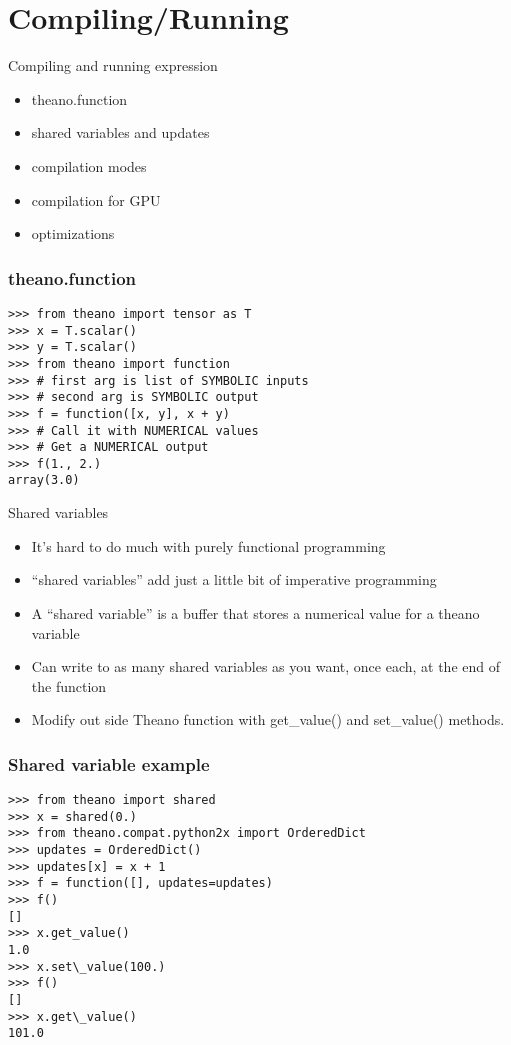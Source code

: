 \documentclass[utf8x,xcolor=pdftex,dvipsnames,table]{beamer}
\begin{document}
\section{Compiling/Running}
\begin{frame}{Compiling and running expression}  
  \begin{itemize}
  \item theano.function
  \item shared variables and updates
  \item compilation modes
  \item compilation for GPU
  \item optimizations
  \end{itemize}
\end{frame}

\begin{frame}[fragile]
  \frametitle{theano.function}

\begin{lstlisting}
>>> from theano import tensor as T
>>> x = T.scalar()
>>> y = T.scalar()
>>> from theano import function
>>> # first arg is list of SYMBOLIC inputs
>>> # second arg is SYMBOLIC output
>>> f = function([x, y], x + y)
>>> # Call it with NUMERICAL values
>>> # Get a NUMERICAL output
>>> f(1., 2.)
array(3.0)
\end{lstlisting}
\end{frame}

\begin{frame}{Shared variables}  
  \begin{itemize}
  \item It’s hard to do much with purely functional programming
  \item ``shared variables'' add just a little bit of imperative programming
  \item A “shared variable” is a buffer that stores a numerical value for a theano variable
  \item Can write to as many shared variables as you want, once each, at the end of the function
  \item  Modify out side Theano function with get\_value() and set\_value() methods.
  \end{itemize}
\end{frame}

\begin{frame}[fragile]
  \frametitle{Shared variable example}

\begin{lstlisting}
>>> from theano import shared
>>> x = shared(0.)
>>> from theano.compat.python2x import OrderedDict
>>> updates = OrderedDict()
>>> updates[x] = x + 1
>>> f = function([], updates=updates)
>>> f()
[]
>>> x.get_value()
1.0
>>> x.set\_value(100.)
>>> f()
[]
>>> x.get\_value()
101.0
\end{lstlisting}
\end{frame}
\end{document}
